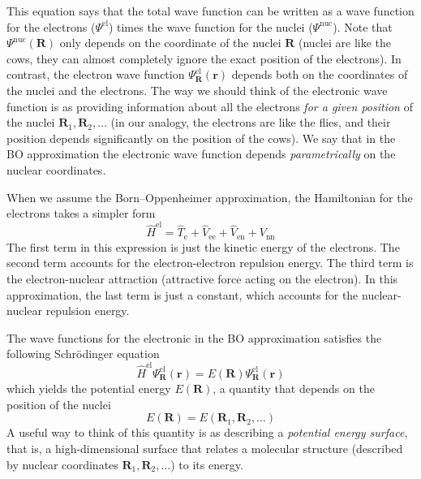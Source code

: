 \documentclass[../Main/chem371-notes.tex]{subfiles}
\begin{document}
This equation says that the total wave function can be written as a wave function for the electrons ($\Psi^\mathrm{el}$) times the wave function for the nuclei ($\Psi^\mathrm{nuc}$).
Note that $\Psi^\mathrm{nuc}(\mathbf{R} )$ only depends on the coordinate of the nuclei $\mathbf{R}$ (nuclei are like the cows, they can almost completely ignore the exact position of the electrons).
In contrast, the electron wave function $\Psi_{\mathbf{R}}^\mathrm{el}(\mathbf{r})$ depends both on the coordinates of the nuclei and the electrons.
The way we should think of the electronic wave function is as providing information about all the electrons \emph{for a given position} of the nuclei $ \mathbf{R}_1,  \mathbf{R}_2,\ldots$ (in our analogy, the electrons are like the flies, and their position depends significantly on the position of the cows).
We say that in the BO approximation the electronic wave function depends \emph{parametrically} on the nuclear coordinates.

When we assume the Born--Oppenheimer approximation, the Hamiltonian for the electrons takes a simpler form
\begin{equation}
\hat{H}^\mathrm{el} = \hat{T}_\mathrm{e} + \hat{V}_\mathrm{ee} + \hat{V}_\mathrm{en} + V_\mathrm{nn}
\end{equation}
The first term in this expression is just the kinetic energy of the electrons. The second term accounts for the electron-electron repulsion energy. The third term is the electron-nuclear attraction (attractive force acting on the electron). In this approximation, the last term is just a constant, which accounts for the nuclear-nuclear repulsion energy.

The wave functions for the electronic in the BO approximation satisfies the following Schr\"{o}dinger equation
\begin{equation}
\label{eq:electronic_SE}
\hat{H}^\mathrm{el}\Psi_{\mathbf{R}}^\mathrm{el}(\mathbf{r}) =
E(\mathbf{R})
\Psi_{\mathbf{R}}^\mathrm{el}(\mathbf{r})
\end{equation}
which yields the potential energy $E(\mathbf{R})$, a quantity that depends on the position of the nuclei
\begin{equation}
E(\mathbf{R})= E(\mathbf{R}_1,  \mathbf{R}_2,\ldots)
\end{equation}
A useful way to think of this quantity is as describing a \emph{potential energy surface}, that is, a high-dimensional surface that relates a molecular structure (described by nuclear coordinates $\mathbf{R}_1,  \mathbf{R}_2,\ldots$) to its energy.
\end{document}
